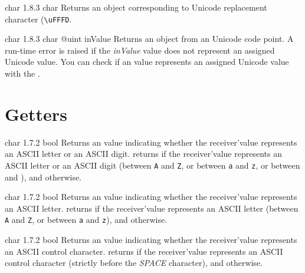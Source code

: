 {char}
{1.8.3}
{char}
{Returns an  object corresponding to Unicode replacement character (\texttt{\textquotesingle\textbackslash uFFFD}.}
{}







{char}
{1.8.3}
{char}
{@uint inValue}
{Returns an  object from an Unicode code point.}
{A run-time error is raised if the \emph{inValue} value does not represent an assigned Unicode value. You can check if an  value represents an assigned Unicode value with the .}


\section{Getters}


{char}
{1.7.2}
{bool}
{Returns an  value indicating whether the receiver'value represents an ASCII letter or an ASCII digit.}
{returns  if the receiver'value represents an ASCII letter or an ASCII digit (between \texttt{\textquotesingle A\textquotesingle} and \texttt{\textquotesingle Z\textquotesingle}, or between \texttt{\textquotesingle a\textquotesingle} and \texttt{\textquotesingle z\textquotesingle}, or between \texttt{\textquotesingle} and \texttt{\textquotesingle}), and  otherwise.}




{char}
{1.7.2}
{bool}
{Returns an  value indicating whether the receiver'value represents an ASCII letter.}
{returns  if the receiver'value represents an ASCII letter (between \texttt{\textquotesingle A\textquotesingle} and \texttt{\textquotesingle Z\textquotesingle}, or between \texttt{\textquotesingle a\textquotesingle} and \texttt{\textquotesingle z\textquotesingle}), and  otherwise.}




{char}
{1.7.2}
{bool}
{Returns an  value indicating whether the receiver'value represents an ASCII control character.}
{returns  if the receiver'value represents an ASCII control character (strictly before the \emph{SPACE} character), and  otherwise.}





